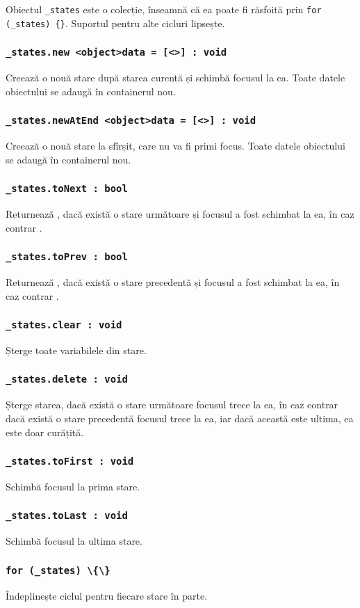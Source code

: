 Obiectul \lstinline|_states| este o colecție, înseamnă că ea poate fi răsfoită prin \lstinline|for (_states) {}|. Suportul pentru alte cicluri lipsește.

\subsubsection{\lstinline|_states.new <object>data = [<>] : void|}

Creează o nouă stare după starea curentă și schimbă focusul la ea. Toate datele obiectului  se adaugă în containerul nou.

\subsubsection{\lstinline|_states.newAtEnd <object>data = [<>] : void|}

Creează o nouă stare la sfîrșit, care nu va fi primi focus.  Toate datele obiectului  se adaugă în containerul nou.

\subsubsection{\lstinline|_states.toNext : bool|}

Returnează \true, dacă există o stare următoare și focusul a fost schimbat la ea, în caz contrar \false.

\subsubsection{\lstinline|_states.toPrev : bool|}

Returnează \true, dacă există o stare precedentă și focusul a fost schimbat la ea, în caz contrar \false.

\subsubsection{\lstinline|_states.clear : void|}

Șterge toate variabilele din stare.

\subsubsection{\lstinline|_states.delete : void|}

Șterge starea, dacă există o stare următoare focusul trece la ea, în caz contrar dacă există o stare precedentă focusul trece la ea, iar dacă această este ultima, ea este doar curățită.

\subsubsection{\lstinline|_states.toFirst : void|}

Schimbă focusul la prima stare.

\subsubsection{\lstinline|_states.toLast : void|}

Schimbă focusul la ultima stare.

\subsubsection{\lstinline|for (_states) \{\}|}

Îndeplinește ciclul pentru fiecare stare în parte.

